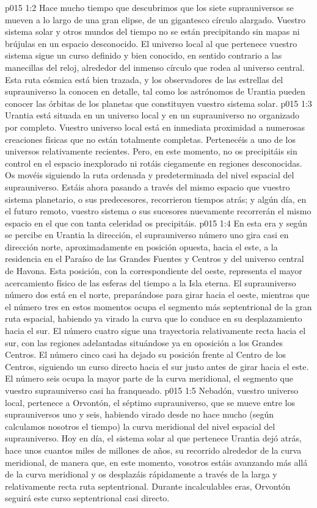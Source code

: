 \vs p015 1:2 Hace mucho tiempo que descubrimos que los siete suprauniversos se mueven a lo largo de una gran elipse, de un gigantesco círculo alargado. Vuestro sistema solar y otros mundos del tiempo no se están precipitando sin mapas ni brújulas en un espacio desconocido. El universo local al que pertenece vuestro sistema sigue un curso definido y bien conocido, en sentido contrario a las manecillas del reloj, alrededor del inmenso círculo que rodea al universo central. Esta ruta cósmica está bien trazada, y los observadores de las estrellas del suprauniverso la conocen en detalle, tal como los astrónomos de Urantia pueden conocer las órbitas de los planetas que constituyen vuestro sistema solar.
\vs p015 1:3 Urantia está situada en un universo local y en un suprauniverso no organizado por completo. Vuestro universo local está en inmediata proximidad a numerosas creaciones físicas que no están totalmente completas. Pertenecéis a uno de los universos relativamente recientes. Pero, en este momento, no os precipitáis sin control en el espacio inexplorado ni rotáis ciegamente en regiones desconocidas. Os movéis siguiendo la ruta ordenada y predeterminada del nivel espacial del suprauniverso. Estáis ahora pasando a través del mismo espacio que vuestro sistema planetario, o sus predecesores, recorrieron tiempos atrás; y algún día, en el futuro remoto, vuestro sistema o sus sucesores nuevamente recorrerán el mismo espacio en el que con tanta celeridad os precipitáis.
\vs p015 1:4 \pc En esta era y según se percibe en Urantia la dirección, el suprauniverso número uno gira casi en dirección norte, aproximadamente en posición opuesta, hacia el este, a la residencia en el Paraíso de las Grandes Fuentes y Centros y del universo central de Havona. Esta posición, con la correspondiente del oeste, representa el mayor acercamiento físico de las esferas del tiempo a la Isla eterna. El suprauniverso número dos está en el norte, preparándose para girar hacia el oeste, mientras que el número tres en estos momentos ocupa el segmento más septentrional de la gran ruta espacial, habiendo ya virado la curva que lo conduce en su desplazamiento hacia el sur. El número cuatro sigue una trayectoria relativamente recta hacia el sur, con las regiones adelantadas situándose ya en oposición a los Grandes Centros. El número cinco casi ha dejado su posición frente al Centro de los Centros, siguiendo un curso directo hacia el sur justo antes de girar hacia el este. El número seis ocupa la mayor parte de la curva meridional, el segmento que vuestro suprauniverso casi ha franqueado.
\vs p015 1:5 Nebadón, vuestro universo local, pertenece a Orvontón, el séptimo suprauniverso, que se mueve entre los suprauniversos uno y seis, habiendo virado desde no hace mucho (según calculamos nosotros el tiempo) la curva meridional del nivel espacial del suprauniverso. Hoy en día, el sistema solar al que pertenece Urantia dejó atrás, hace unos cuantos miles de millones de años, su recorrido alrededor de la curva meridional, de manera que, en este momento, vosotros estáis avanzando más allá de la curva meridional y os desplazáis rápidamente a través de la larga y relativamente recta ruta septentrional. Durante incalculables eras, Orvontón seguirá este curso septentrional casi directo.
